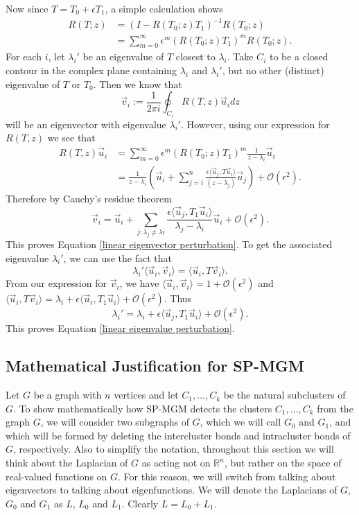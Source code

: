 \documentclass[10pt,journal,compsoc]{IEEEtran} %
\theoremstyle{definition}
\newcommand{\bbr}{\mathbb R}
\newcommand{\sheaf}[1]{\mathcal{#1}}
\begin{document}
Now since $T = T_0 + \epsilon T_1$, a simple calculation shows
\begin{align*} R(T;z) & = (I-R(T_0;z)T_1)^{-1}R(T_0;z)\\ & =
\sum_{m=0}^\infty \epsilon^m(R(T_0;z)T_1)^mR(T_0;z).
\end{align*} For each $i$, let $\lambda_i'$ be an eigenvalue of $T$
closest to $\lambda_i$.  Take $C_i$ to be a closed contour in the
complex plane containing $\lambda_i$ and $\lambda_i'$, but no other
(distinct) eigenvalue of $T$ or $T_0$.  Then we know that
$$\vec v_i := \frac{1}{2\pi i}\oint_{C_i} R(T,z)\vec u_idz$$
will be an eigenvector with eigenvalue $\lambda_i'$.  However, using
our expression for $R(T,z)$ we see that
\begin{align*} R(T,z)\vec u_i & = \sum_{m=0}^\infty
\epsilon^m(R(T_0;z)T_1)^m \frac{1}{z-\lambda_i}\vec u_i\\ & =
\frac{1}{z-\lambda_i}\left(\vec u_i + \sum_{j=i}^n
\frac{\epsilon\langle \vec u_j,T\vec u_i\rangle}{(z-\lambda_j)}\vec
u_j\right) + \sheaf O(\epsilon^2).
\end{align*} Therefore by Cauchy's residue theorem
$$\vec v_i = \vec u_i + \sum_{j:\lambda_j\neq\lambda i}\frac{\epsilon\langle \vec u_j,T_1\vec u_i\rangle}{\lambda_j-\lambda_i}\vec u_i + \sheaf O(\epsilon^2).$$
This proves Equation \ref{linear eigenvector perturbation}.  To get
the associated eigenvalue $\lambda_i'$, we can use the fact that
$$\lambda_i'\langle \vec u_i,\vec v_i\rangle = \langle \vec u_i,T\vec v_i\rangle.$$
From our expression for $\vec v_i$, we have $\langle \vec u_i,\vec
v_i\rangle = 1 + \sheaf O(\epsilon^2)$ and $\langle \vec u_i,T\vec
v_i\rangle = \lambda_i + \epsilon\langle\vec u_i,T_1\vec u_i\rangle +
\sheaf O(\epsilon^2)$.  Thus
$$\lambda_i'  = \lambda_i + \epsilon\langle \vec u_j,T_1\vec u_i\rangle + \sheaf O(\epsilon^2).$$
This proves Equation \ref{linear eigenvalue perturbation}.


\subsection*{Mathematical Justification for SP-MGM}
Let $G$ be a graph with $n$ vertices and let $C_1,\dots, C_k$ be the
natural subclusters of $G$.  To show mathematically how SP-MGM detects
the clusters $C_1,\dots, C_k$ from the graph $G$, we will consider two
subgraphs of $G$, which we will call $G_0$ and $G_1$, and which will
be formed by deleting the intercluster bonds and intracluster bonds of
$G$, respectively.  Also to simplify the notation, throughout this
section we will think about the Laplacian of $G$ as acting not on
$\bbr^n$, but rather on the space of real-valued functions on $G$.
For this reason, we will switch from talking about eigenvectors to
talking about eigenfunctions.  We will denote the Laplacians of $G$,
$G_0$ and $G_1$ as $L$, $L_0$ and $L_1$.  Clearly $L = L_0 + L_1$.
\end{document}
